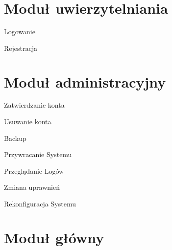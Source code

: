 \section{Moduł uwierzytelniania}

\begin{class}{Logowanie}
\end{class}

\begin{class}{Rejestracja}
\end{class}

\section{Moduł administracyjny}

\begin{class}{Zatwierdzanie konta}
\end{class}

\begin{class}{Usuwanie konta}
\end{class}

\begin{class}{Backup}
\end{class}

\begin{class}{Przywracanie Systemu}
\end{class}

\begin{class}{Przeglądanie Logów}
\end{class}

\begin{class}{Zmiana uprawnień}
\end{class}

\begin{class}{Rekonfiguracja Systemu}
\end{class}

\section{Moduł główny}

